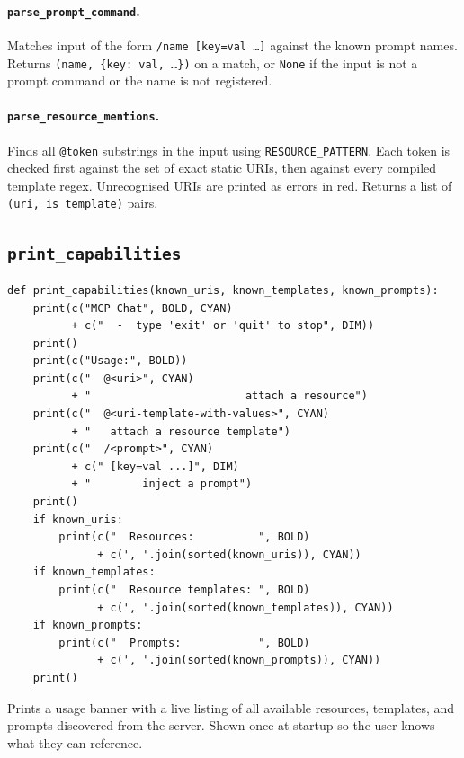\documentclass[11pt, a4paper]{article}
\begin{document}
\paragraph{\texttt{parse\_prompt\_command}.}
Matches input of the form \texttt{/name [key=val \ldots]} against the known prompt names. Returns \texttt{(name, \{key: val, \ldots\})} on a match, or \texttt{None} if the input is not a prompt command or the name is not registered.

\paragraph{\texttt{parse\_resource\_mentions}.}
Finds all \texttt{@token} substrings in the input using \texttt{RESOURCE\_PATTERN}. Each token is checked first against the set of exact static URIs, then against every compiled template regex. Unrecognised URIs are printed as errors in red. Returns a list of \texttt{(uri, is\_template)} pairs.

\subsection{\texttt{print\_capabilities}}

\begin{lstlisting}[caption={print\_capabilities}]
def print_capabilities(known_uris, known_templates, known_prompts):
    print(c("MCP Chat", BOLD, CYAN)
          + c("  -  type 'exit' or 'quit' to stop", DIM))
    print()
    print(c("Usage:", BOLD))
    print(c("  @<uri>", CYAN)
          + "                        attach a resource")
    print(c("  @<uri-template-with-values>", CYAN)
          + "   attach a resource template")
    print(c("  /<prompt>", CYAN)
          + c(" [key=val ...]", DIM)
          + "        inject a prompt")
    print()
    if known_uris:
        print(c("  Resources:          ", BOLD)
              + c(', '.join(sorted(known_uris)), CYAN))
    if known_templates:
        print(c("  Resource templates: ", BOLD)
              + c(', '.join(sorted(known_templates)), CYAN))
    if known_prompts:
        print(c("  Prompts:            ", BOLD)
              + c(', '.join(sorted(known_prompts)), CYAN))
    print()
\end{lstlisting}

Prints a usage banner with a live listing of all available resources, templates, and prompts discovered from the server. Shown once at startup so the user knows what they can reference.
\end{document}
